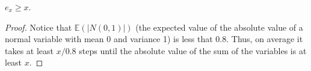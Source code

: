 \begin{solution}
\begin{lemma}
	$e_x \geq x$.
\end{lemma}
\begin{proof}
	Notice that $\mathbb{E}(|N(0,1)|)$ (the expected value of the absolute value of a normal variable with mean 0 and variance 1) is less that $0.8$. Thus, on average it takes at least $x/0.8$ steps until the absolute value of the sum of the variables is at least $x$.
\end{proof}
\end{solution}
